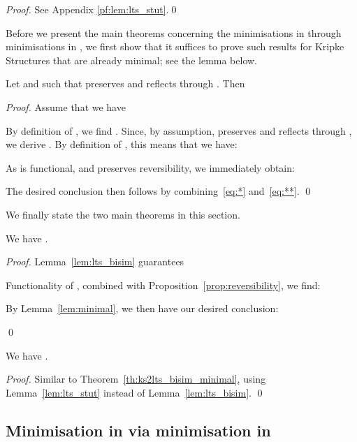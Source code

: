 \documentclass{llncs}
\begin{document}
\begin{proof}
See Appendix \ref{pf:lem:lts_stut}.\qed
\end{proof}
Before we present the main theorems concerning the minimisations in \KS
through minimisations in \LTS, we first show that it suffices to prove
such results for Kripke Structures that are already minimal; see the
lemma below.
\begin{lemma}
\label{lem:minimal}
Let  and
 such that  preserves and reflects  through
.  Then

\end{lemma}

\begin{proof}
Assume that we have

By definition of , we find
.
Since, by assumption,  preserves and reflects  through
, we derive
.
By definition of , this means that we have:

As  is functional, and  preserves
reversibility, we immediately obtain:

The desired conclusion then follows by combining~\ref{eq:*} and~\ref{eq:**}.
\qed
\end{proof}
We finally state the two main theorems in this section.
\begin{theorem}
\label{th:ks2lts_bisim_minimal}
We have .
\end{theorem}

\begin{proof}
Lemma~\ref{lem:lts_bisim} guarantees

Functionality of , combined with Proposition~\ref{prop:reversibility},
we find:

By Lemma~\ref{lem:minimal}, we then have our desired conclusion:

\qed
\end{proof}


\begin{theorem}
\label{th:ks2lts_stut_minimal}
We have  .
\end{theorem}

\begin{proof}
Similar to
Theorem~\ref{th:ks2lts_bisim_minimal}, using Lemma~\ref{lem:lts_stut}
instead of Lemma~\ref{lem:lts_bisim}. \qed
\end{proof}


\subsection{Minimisation in \LTS via minimisation in \KS}
\end{document}
